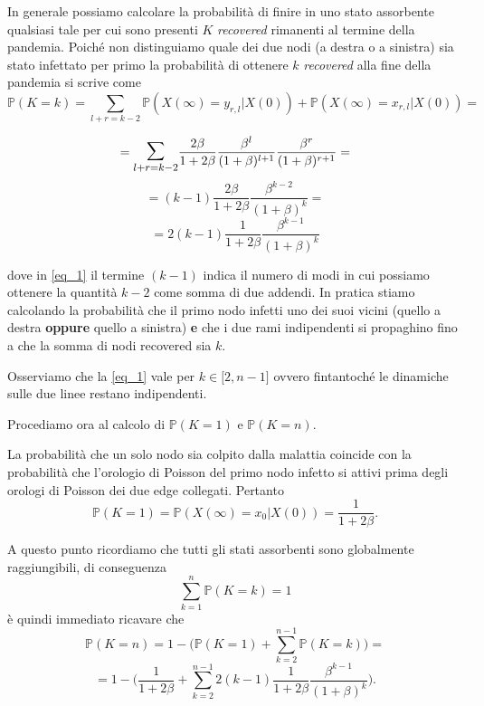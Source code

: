        In generale possiamo calcolare la probabilità di finire in uno stato assorbente qualsiasi tale per cui sono presenti $K$ \textit{recovered} rimanenti al termine della pandemia. Poiché non distinguiamo quale dei due nodi (a destra o a sinistra) sia stato infettato per primo la probabilità di ottenere $k$ \textit{recovered} alla fine della pandemia si scrive come
        \[
	\mathbb{P}(K=k)=\sum_{l+r=k-2} \mathbb{P}(X(\infty)=y_{r,l} | X(0))  +\mathbb{P}(X(\infty)=x_{r,l} | X(0))=
        \]

                \[
	=\mathlarger{\mathlarger{\sum}}_{l+r=k-2}\frac{2\beta}{1+2\beta}\frac{\beta^l}{(1+\beta)^{l+1}}\frac{\beta^r}{(1+\beta)^{r+1}} =
        \]
          \[
	=(k-1)\frac{2\beta}{1+2\beta}\frac{\beta^{k-2}}{(1+\beta)^k}=
        \]
         \begin{equation}\label{eq_1}
	=2(k-1)\frac{1}{1+2\beta}\frac{\beta^{k-1}}{(1+\beta)^k}
	\end{equation}
       

dove in \eqref{eq_1} il termine $(k-1)$ indica il numero di modi in cui possiamo ottenere la quantità $k-2$ come somma di due addendi. In pratica stiamo calcolando la probabilità che il primo nodo infetti uno dei suoi vicini (quello a destra \textbf{oppure} quello a sinistra) \textbf{e} che i due rami indipendenti si propaghino fino a che la somma di nodi recovered sia \(k\).

Osserviamo che la \eqref{eq_1} vale per $k \in \lbrack 2,n-1 \rbrack $ ovvero fintantoché le dinamiche sulle due linee restano indipendenti. 

Procediamo ora al calcolo di $\mathbb{P}(K=1)$ e $\mathbb{P}(K=n)$.

La probabilità che un solo nodo sia colpito dalla malattia coincide con la probabilità che l'orologio di Poisson del primo nodo infetto si attivi prima degli orologi di Poisson dei due edge collegati.
Pertanto
  \[
		\mathbb{P}(K=1)=\mathbb{P}(X(\infty)= x_0 | X(0))=\frac{1}{1+2\beta}.
		      \]

       
  A questo punto ricordiamo che tutti gli stati assorbenti sono globalmente raggiungibili, di conseguenza
       \[
		\sum_{k=1}^{n} \mathbb{P}(K=k) =1
        \]
	è quindi immediato ricavare che
          \[
		\mathbb{P}(K=n)=1-\bigg(\mathbb{P}(K=1)+\sum_{k=2}^{n-1}\mathbb{P}(K=k) \bigg) =
        \]
         \[
		=1-\bigg(\frac{1}{1+2\beta}+\sum_{k=2}^{n-1}2(k-1)\frac{1}{1+2\beta}\frac{\beta^{k-1}}{(1+\beta)^k} \bigg).
        \]


	  






